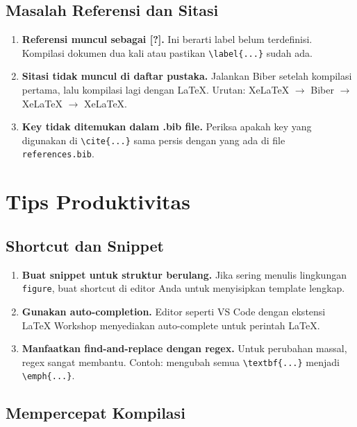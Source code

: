 \subsection{Masalah Referensi dan Sitasi}

\begin{enumerate}
  \item \textbf{Referensi muncul sebagai [?].} Ini berarti label belum terdefinisi. Kompilasi dokumen dua kali atau pastikan \verb|\label{...}| sudah ada.

  \item \textbf{Sitasi tidak muncul di daftar pustaka.} Jalankan Biber setelah kompilasi pertama, lalu kompilasi lagi dengan \LaTeX. Urutan: XeLaTeX $\rightarrow$ Biber $\rightarrow$ XeLaTeX $\rightarrow$ XeLaTeX.

  \item \textbf{Key tidak ditemukan dalam .bib file.} Periksa apakah key yang digunakan di \verb|\cite{...}| sama persis dengan yang ada di file \texttt{references.bib}.
\end{enumerate}

\section{Tips Produktivitas}

\subsection{Shortcut dan Snippet}

\begin{enumerate}
  \item \textbf{Buat snippet untuk struktur berulang.} Jika sering menulis lingkungan \verb|figure|, buat shortcut di editor Anda untuk menyisipkan template lengkap.

  \item \textbf{Gunakan auto-completion.} Editor seperti VS Code dengan ekstensi LaTeX Workshop menyediakan auto-complete untuk perintah \LaTeX.

  \item \textbf{Manfaatkan find-and-replace dengan regex.} Untuk perubahan massal, regex sangat membantu. Contoh: mengubah semua \verb|\textbf{...}| menjadi \verb|\emph{...}|.
\end{enumerate}

\subsection{Mempercepat Kompilasi}

